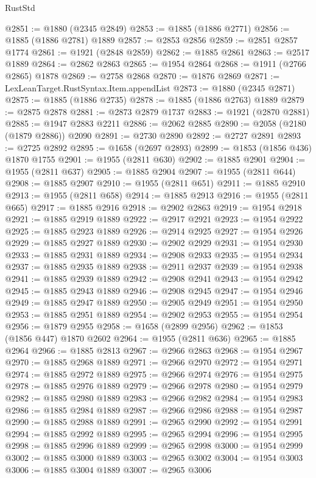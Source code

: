 \begin{lexlean}{RustStd}
\begin{coremodule}
{\begin{coremodule}
{{{{{{{{{{{{{{{{{{{{{{{{{{{{{@2851 := @1880 (@2345 @2849)
@2853 := @1885 (@1886 @2771)
@2856 := @1885 (@1886 @2781) @1889
@2857 := @2853 @2856
@2859 := @2851 @2857 @1774
@2861 := @1921 (@2848 @2859)
@2862 := @1885 @2861
@2863 := @2517 @1889
@2864 := @2862 @2863
@2865 := @1954 @2864
@2868 := @1911 (@2766 @2865) @1878
@2869 := @2758 @2868
@2870 := @1876 @2869
@2871 := LexLeanTarget.RustSyntax.Item.appendList
@2873 := @1880 (@2345 @2871)
@2875 := @1885 (@1886 @2735)
@2878 := @1885 (@1886 @2763) @1889
@2879 := @2875 @2878
@2881 := @2873 @2879 @1737
@2883 := @1921 (@2870 @2881)
@2885 := @1947 @2883 @2211
@2886 := @2062 @2885
@2890 := @2058 (@2180 (@1879 @2886)) @2090
@2891 := @2730 @2890
@2892 := @2727 @2891
@2893 := @2725 @2892
@2895 := @1658 (@2697 @2893)
@2899 := @1853 (@1856 @436) @1870 @1755
@2901 := @1955 (@2811 @630)
@2902 := @1885 @2901
@2904 := @1955 (@2811 @637)
@2905 := @1885 @2904
@2907 := @1955 (@2811 @644)
@2908 := @1885 @2907
@2910 := @1955 (@2811 @651)
@2911 := @1885 @2910
@2913 := @1955 (@2811 @658)
@2914 := @1885 @2913
@2916 := @1955 (@2811 @665)
@2917 := @1885 @2916
@2918 := @2902 @2863
@2919 := @1954 @2918
@2921 := @1885 @2919 @1889
@2922 := @2917 @2921
@2923 := @1954 @2922
@2925 := @1885 @2923 @1889
@2926 := @2914 @2925
@2927 := @1954 @2926
@2929 := @1885 @2927 @1889
@2930 := @2902 @2929
@2931 := @1954 @2930
@2933 := @1885 @2931 @1889
@2934 := @2908 @2933
@2935 := @1954 @2934
@2937 := @1885 @2935 @1889
@2938 := @2911 @2937
@2939 := @1954 @2938
@2941 := @1885 @2939 @1889
@2942 := @2908 @2941
@2943 := @1954 @2942
@2945 := @1885 @2943 @1889
@2946 := @2908 @2945
@2947 := @1954 @2946
@2949 := @1885 @2947 @1889
@2950 := @2905 @2949
@2951 := @1954 @2950
@2953 := @1885 @2951 @1889
@2954 := @2902 @2953
@2955 := @1954 @2954
@2956 := @1879 @2955
@2958 := @1658 (@2899 @2956)
@2962 := @1853 (@1856 @447) @1870 @2602
@2964 := @1955 (@2811 @636)
@2965 := @1885 @2964
@2966 := @1885 @2813
@2967 := @2966 @2863
@2968 := @1954 @2967
@2970 := @1885 @2968 @1889
@2971 := @2966 @2970
@2972 := @1954 @2971
@2974 := @1885 @2972 @1889
@2975 := @2966 @2974
@2976 := @1954 @2975
@2978 := @1885 @2976 @1889
@2979 := @2966 @2978
@2980 := @1954 @2979
@2982 := @1885 @2980 @1889
@2983 := @2966 @2982
@2984 := @1954 @2983
@2986 := @1885 @2984 @1889
@2987 := @2966 @2986
@2988 := @1954 @2987
@2990 := @1885 @2988 @1889
@2991 := @2965 @2990
@2992 := @1954 @2991
@2994 := @1885 @2992 @1889
@2995 := @2965 @2994
@2996 := @1954 @2995
@2998 := @1885 @2996 @1889
@2999 := @2965 @2998
@3000 := @1954 @2999
@3002 := @1885 @3000 @1889
@3003 := @2965 @3002
@3004 := @1954 @3003
@3006 := @1885 @3004 @1889
@3007 := @2965 @3006
}}}}}}}}}}}}}}}}}}}}}}}}}}}}}
\end{coremodule}}
\end{coremodule}
\end{lexlean}
